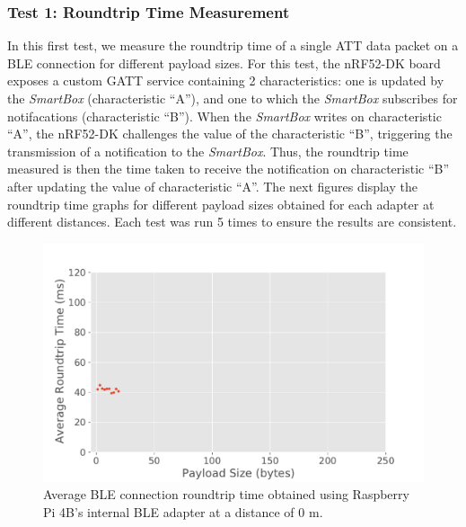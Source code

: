 \subsubsection{Test 1: Roundtrip Time Measurement}

In this first test, we measure the roundtrip time of a single \acs{ATT} data packet on a \acs{BLE} connection for different payload sizes. For this test, the nRF52-DK board exposes a custom \acs{GATT} service containing 2 characteristics: one is updated by the \textit{SmartBox} (characteristic ``A''), and one to which the \textit{SmartBox} subscribes for notifacations (characteristic ``B''). When the \textit{SmartBox} writes on characteristic ``A'', the nRF52-DK challenges the value of the characteristic ``B'', triggering the transmission of a notification to the \textit{SmartBox}. Thus, the roundtrip time measured is then the time taken to receive the notification on characteristic ``B'' after updating the value of characteristic ``A''. The next figures display the roundtrip time graphs for different payload sizes obtained for each adapter at different distances. %
Each test was run 5 times to ensure the results are consistent.

\begin{figure}[H]
    \centering
    \includegraphics[width=0.75\linewidth]{images/ble-roundtrip-hci1-0cm.pdf}
    \caption[Average \acs{BLE} connection roundtrip time obtained using Raspberry Pi 4B's internal \acs{BLE} adapter at a distance of 0 m.]{Average \acs{BLE} connection roundtrip time obtained using Raspberry Pi 4B's internal \acs{BLE} adapter at a distance of $0\text{ m}$.}
    \label{fig:ble-roundtrip-hci1-0m}
\end{figure}

